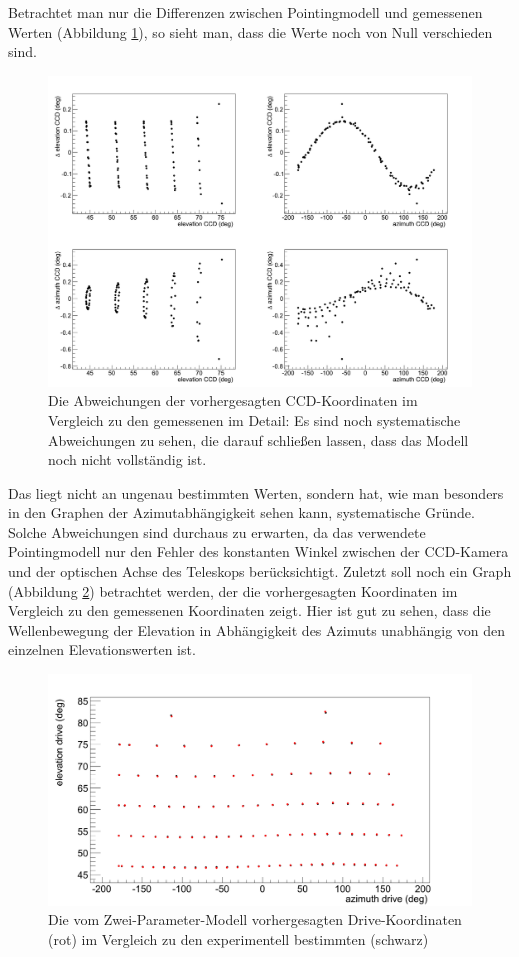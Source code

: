Betrachtet man nur die Differenzen zwischen Pointingmodell und gemessenen Werten (Abbildung \ref{img:C2D}), so sieht man, dass die Werte noch von Null verschieden sind.%
\begin{figure}[htbp]
\centering
\includegraphics[width=\textwidth]{../341/C2D.png}
\caption{Die Abweichungen der vorhergesagten CCD-Koordinaten im Vergleich zu den gemessenen im Detail: Es sind noch systematische Abweichungen zu sehen, die darauf schließen lassen, dass das Modell noch nicht vollständig ist.}
\label{img:C2D}
\end{figure}
Das liegt nicht an ungenau bestimmten Werten, sondern hat, wie man besonders in den Graphen der Azimutabhängigkeit sehen kann, systematische Gründe. Solche Abweichungen sind durchaus zu erwarten, da das verwendete Pointingmodell nur den Fehler des konstanten Winkel zwischen der CCD-Kamera und der optischen Achse des Teleskops berücksichtigt. Zuletzt soll noch ein Graph (Abbildung \ref{img:C2Dcomp2}) betrachtet werden, der die vorhergesagten Koordinaten im Vergleich zu den gemessenen Koordinaten zeigt. Hier ist gut zu sehen, dass die Wellenbewegung der Elevation in Abhängigkeit des Azimuts unabhängig von den einzelnen Elevationswerten ist.\newpage
\begin{figure}[htbp]
\centering
\includegraphics[width=\textwidth]{../341/C2Dcomp2.png}
\caption{Die vom Zwei-Parameter-Modell vorhergesagten Drive-Koordinaten (rot) im Vergleich zu den experimentell bestimmten (schwarz)}
\label{img:C2Dcomp2}
\end{figure}
